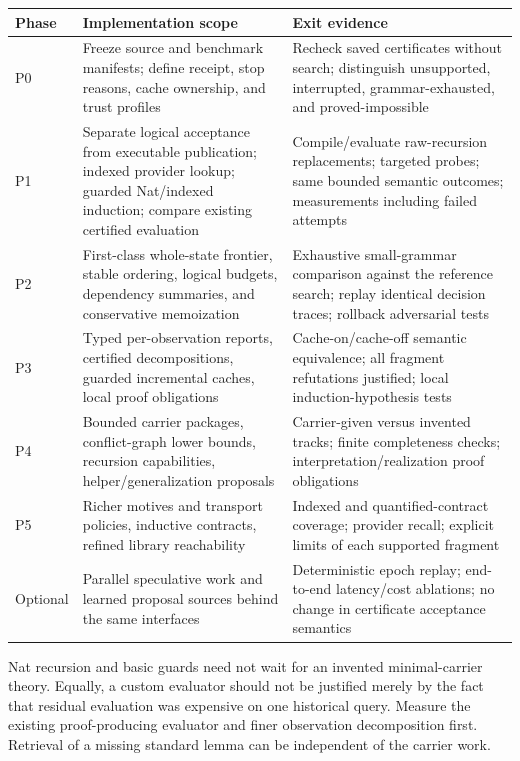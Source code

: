 \documentclass[11pt,a4paper]{article}
\theoremstyle{definition}
\theoremstyle{remark}
\begin{document}
\begin{longtable}{@{}L{18mm}L{62mm}L{68mm}@{}}
\toprule
Phase & Implementation scope & Exit evidence\\
\midrule\endhead
P0 & Freeze source and benchmark manifests; define receipt, stop reasons,
cache ownership, and trust profiles & Recheck saved certificates without search;
distinguish unsupported, interrupted, grammar-exhausted, and proved-impossible\\
P1 & Separate logical acceptance from executable publication; indexed provider
lookup; guarded Nat/indexed induction; compare existing certified evaluation &
Compile/evaluate raw-recursion replacements; targeted probes; same bounded
semantic outcomes; measurements including failed attempts\\
P2 & First-class whole-state frontier, stable ordering, logical budgets,
dependency summaries, and conservative memoization & Exhaustive small-grammar
comparison against the reference search; replay identical decision traces;
rollback adversarial tests\\
P3 & Typed per-observation reports, certified decompositions, guarded incremental
caches, local proof obligations & Cache-on/cache-off semantic equivalence;
all fragment refutations justified; local induction-hypothesis tests\\
P4 & Bounded carrier packages, conflict-graph lower bounds, recursion capabilities,
helper/generalization proposals & Carrier-given versus invented tracks;
finite completeness checks; interpretation/realization proof obligations\\
P5 & Richer motives and transport policies, inductive contracts, refined
library reachability & Indexed and quantified-contract coverage; provider recall;
explicit limits of each supported fragment\\
Optional & Parallel speculative work and learned proposal sources behind the same
interfaces & Deterministic epoch replay; end-to-end latency/cost ablations;
no change in certificate acceptance semantics\\
\bottomrule
\end{longtable}
Nat recursion and basic guards need not wait for an invented minimal-carrier
theory. Equally, a custom evaluator should not be justified merely by the fact
that residual evaluation was expensive on one historical query. Measure the
existing proof-producing evaluator and finer observation decomposition first.
Retrieval of a missing standard lemma can be independent of the carrier work.
\end{document}
